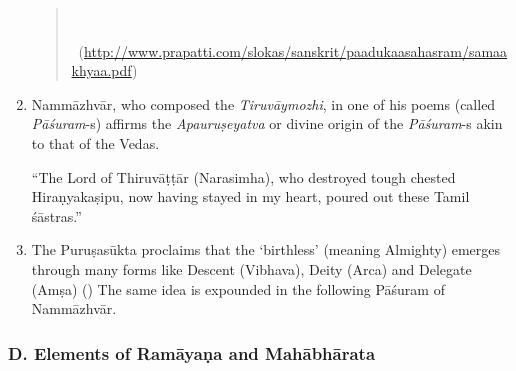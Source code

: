 \begin{enumerate}[{\rm 1.}]
\begin{verse}
\\

~\hfill (\url{http://www.prapatti.com/slokas/sanskrit/paadukaasahasram/samaakhyaa.pdf})
\end{verse}


 \item 
 Nammāzhvār, who composed the \textit{Tiruvāymozhi}, in one of his poems (called \textit{Pāśuram}-s) affirms the \textit{Apauruṣeyatva} or divine origin of the \textit{Pāśuram}-s akin to that of the Vedas.

\begin{myquote}
\end{myquote}

 “The Lord of Thiruvāṭṭār (Narasimha), who destroyed tough chested Hiraṇyakaṣipu, now having stayed in my heart, poured out these Tamil śāstras.”

 \item 
 The Puruṣasūkta proclaims that the ‘birthless’ (meaning Almighty) emerges through many forms like Descent (Vibhava), Deity (Arca) and Delegate (Amṣa) (\textbf{}) The same idea is expounded in the following Pāśuram of Nammāzhvār.


\end{enumerate}


\subsubsection*{D. Elements of Ramāyaṇa and Mahābhārata}

